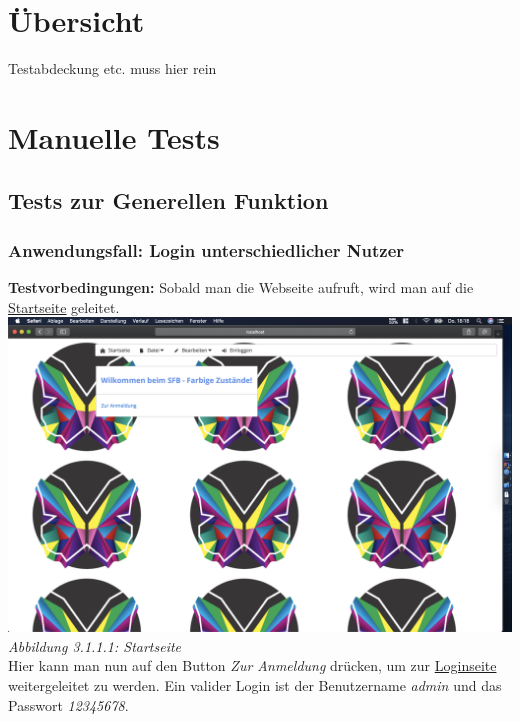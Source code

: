 \documentclass[enabledeprecatedfontcommands,fontsize=12pt,paper=a4,twoside]{scrartcl}
\begin{document}

\newpage
\section{Übersicht}
{
\color {red} Testabdeckung etc. muss hier rein
}

\newpage
\section{Manuelle Tests}


\subsection{Tests zur Generellen Funktion}

\subsubsection{Anwendungsfall: Login unterschiedlicher Nutzer}

\textbf{Testvorbedingungen:} Sobald man die Webseite aufruft, wird man auf die \hyperlink{sc3.1.1.1}{Startseite}  geleitet. \\

\hypertarget{sc3.1.1.1}{
\includegraphics[width=1\textwidth]{Screenshots/311StartSite.png}
\textit{Abbildung 3.1.1.1: Startseite}
} \\

Hier kann man nun auf den Button \textit{Zur Anmeldung} drücken, um zur \hyperlink{sc3.1.1.2}{Loginseite} weitergeleitet zu werden. Ein valider Login ist der Benutzername \textit{admin} und das Passwort \textit{12345678}. \\
\end{document}
